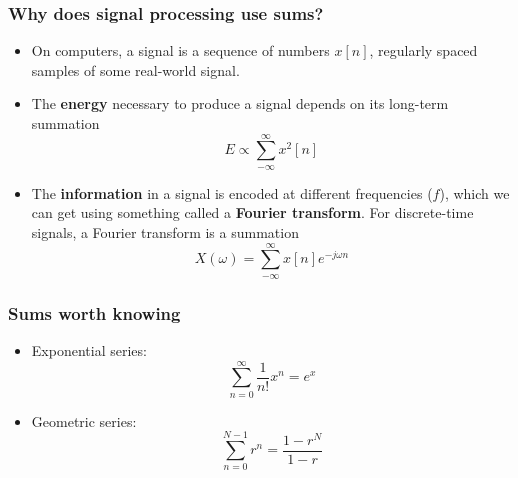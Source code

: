 \documentclass{beamer}
\begin{document}
\begin{frame}
  \frametitle{Why does signal processing use sums?}
  \begin{itemize}
  \item On computers, a signal is a sequence of numbers $x[n]$,
    regularly spaced samples of some real-world signal.
  \item The {\bf energy} necessary to produce a signal depends on its
    long-term summation
    \[
    E \propto \sum_{-\infty}^\infty x^2[n]
    \]
  \item The {\bf information} in a signal is encoded at different
    frequencies ($f$), which we can get using something called a {\bf
      Fourier transform}.  For discrete-time signals, a Fourier
    transform is a summation
    \[
    X(\omega) = \sum_{-\infty}^\infty x[n] e^{-j\omega n}
    \]
  \end{itemize}
\end{frame}

\begin{frame}
  \frametitle{Sums worth knowing}
  \begin{itemize}
  \item Exponential series:
    \[
    \sum_{n=0}^\infty \frac{1}{n!} x^n = e^x
    \]
  \item Geometric series:
    \[
    \sum_{n=0}^{N-1} r^n = \frac{1-r^N}{1-r}
    \]
  \end{itemize}
\end{frame}
\end{document}
